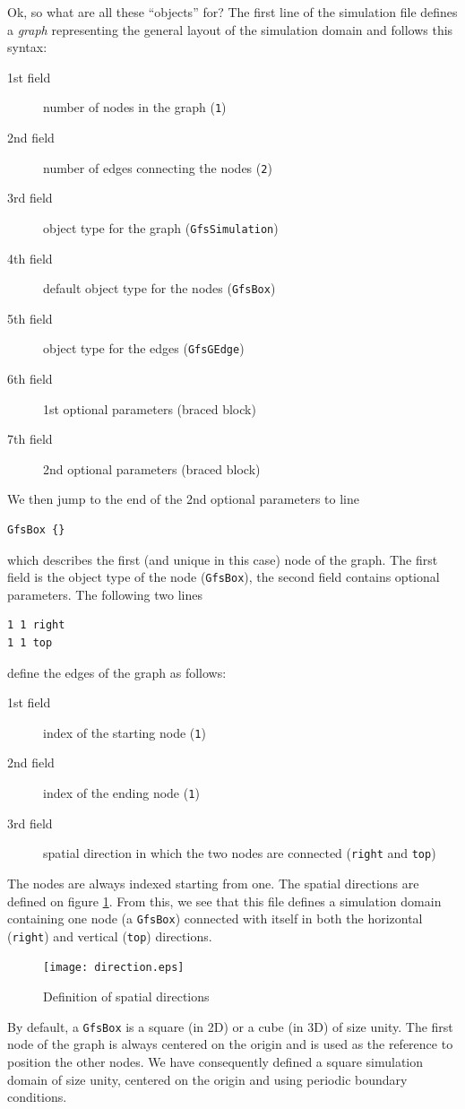 \documentclass[a4paper]{article}
\begin{document}
Ok, so what are all these ``objects'' for?  The first line of the
simulation file defines a {\em graph} representing the general layout
of the simulation domain and follows this syntax:
\begin{description}
\item[1st field] number of nodes in the graph ({\tt 1})
\item[2nd field] number of edges connecting the nodes ({\tt 2})
\item[3rd field] object type for the graph ({\tt GfsSimulation})
\item[4th field] default object type for the nodes ({\tt GfsBox})
\item[5th field] object type for the edges ({\tt GfsGEdge})
\item[6th field] 1st optional parameters (braced block)
\item[7th field] 2nd optional parameters (braced block)
\end{description}
We then jump to the end of the 2nd optional parameters to line
\begin{verbatim}
GfsBox {}
\end{verbatim}
which describes the first (and unique in this case) node of the
graph. The first field is the object type of the node ({\tt GfsBox}),
the second field contains optional parameters.
The following two lines 
\begin{verbatim}
1 1 right
1 1 top
\end{verbatim}
define the edges of the graph as follows:
\begin{description}
\item[1st field] index of the starting node ({\tt 1})
\item[2nd field] index of the ending node   ({\tt 1})
\item[3rd field] spatial direction in which the two nodes are
connected ({\tt right} and {\tt top})
\end{description}
The nodes are always indexed starting from one. The spatial directions 
are defined on figure \ref{direction}.
From this, we see that this file defines a simulation domain
containing one node (a {\tt GfsBox}) connected with itself in both the
horizontal ({\tt right}) and vertical ({\tt top}) directions.
\begin{figure}[htbp]
\begin{center}
\texttt{[image: direction.eps]}
\end{center}
\caption{Definition of spatial directions}
\label{direction}
\end{figure}
By default, a {\tt GfsBox} is a square (in 2D) or a cube (in 3D) of
size unity. The first node of the graph is always centered on the
origin and is used as the reference to position the other nodes.  We
have consequently defined a square simulation domain of size unity,
centered on the origin and using periodic boundary conditions.
\end{document}
